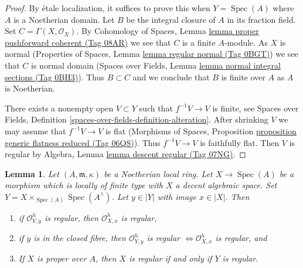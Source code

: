 \documentclass{amsart}
\theoremstyle{plain}
\newtheorem{lemma}[subsection]{Lemma}
\theoremstyle{definition}
\theoremstyle{remark}
\numberwithin{equation}{subsection}
\def\Spec{\mathop{\mathrm{Spec}}}
\begin{document}
\begin{proof}
By \'etale localization, it suffices to prove this when
$Y = \Spec(A)$ where $A$ is a Noetherian domain.
Let $B$ be the integral closure of $A$ in its fraction field.
Set $C = \Gamma(X, \mathcal{O}_X)$. By
Cohomology of Spaces, Lemma
\href{https://stacks.math.columbia.edu/tag/08AR}{lemma proper pushforward coherent (Tag 08AR)}
we see that $C$ is a finite $A$-module.
As $X$ is normal
(Properties of Spaces, Lemma
\href{https://stacks.math.columbia.edu/tag/0BGT}{lemma regular normal (Tag 0BGT)})
we see that $C$ is normal domain
(Spaces over Fields, Lemma
\href{https://stacks.math.columbia.edu/tag/0BH3}{lemma normal integral sections (Tag 0BH3)}).
Thus $B \subset C$ and we conclude that $B$ is finite over $A$
as $A$ is Noetherian.

\medskip\noindent
There exists a nonempty open $V \subset Y$ such that $f^{-1}V \to V$
is finite, see Spaces over Fields, Definition
\ref{spaces-over-fields-definition-alteration}.
After shrinking $V$ we may assume that $f^{-1}V \to V$ is flat
(Morphisms of Spaces, Proposition
\href{https://stacks.math.columbia.edu/tag/06QS}{proposition generic flatness reduced (Tag 06QS)}).
Thus $f^{-1}V \to V$ is faithfully flat. Then $V$ is regular by
Algebra, Lemma \href{https://stacks.math.columbia.edu/tag/07NG}{lemma descent regular (Tag 07NG)}.
\end{proof}


\begin{lemma}
\label{lemma-port-regularity-to-completion}
Let $(A, \mathfrak m, \kappa)$ be a Noetherian local ring.
Let $X \to \Spec(A)$ be a morphism which is locally of finite type
with $X$ a decent algebraic space. Set
$Y = X \times_{\Spec(A)} \Spec(A^\wedge)$. Let $y \in |Y|$
with image $x \in |X|$. Then
\begin{enumerate}
\item if $\mathcal{O}_{Y, y}^h$ is regular, then
$\mathcal{O}_{X, x}^h$ is regular,
\item if $y$ is in the closed fibre, then $\mathcal{O}_{Y, y}^h$ is regular
$\Leftrightarrow \mathcal{O}_{X, x}^h$ is regular, and
\item If $X$ is proper over $A$, then $X$ is regular
if and only if $Y$ is regular.
\end{enumerate}
\end{lemma}
\end{document}
